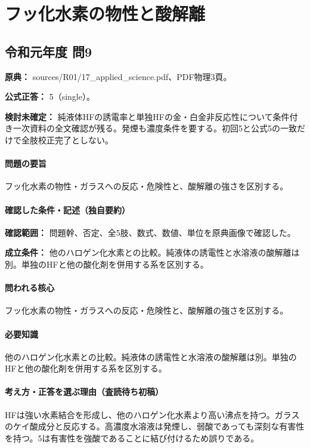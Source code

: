 \section{フッ化水素の物性と酸解離}

\subsection{令和元年度 問9}
\label{q:r01-reg-applied-09}

\noindent\textbf{原典：} sources/R01/17\_applied\_science.pdf、PDF物理3頁。

\textbf{公式正答：} 5（single）。

\par\textbf{検討未確定：} 純液体HFの誘電率と単独HFの金・白金非反応性について条件付き一次資料の全文確認が残る。発煙も濃度条件を要する。初回5と公式5の一致だけで全肢校正完了としない。

\paragraph{問題の要旨} フッ化水素の物性・ガラスへの反応・危険性と、酸解離の強さを区別する。

\paragraph{確認した条件・記述（独自要約）}\mbox{}\par

\noindent\textbf{確認範囲：} 問題幹、否定、全5肢、数式、数値、単位を原典画像で確認した。\par

\noindent\textbf{成立条件：} 他のハロゲン化水素との比較。純液体の誘電性と水溶液の酸解離は別。単独のHFと他の酸化剤を併用する系を区別する。\par

\paragraph{問われる核心} フッ化水素の物性・ガラスへの反応・危険性と、酸解離の強さを区別する。

\paragraph{必要知識} 他のハロゲン化水素との比較。純液体の誘電性と水溶液の酸解離は別。単独のHFと他の酸化剤を併用する系を区別する。

\paragraph{考え方・正答を選ぶ理由（査読待ち初稿）} HFは強い水素結合を形成し、他のハロゲン化水素より高い沸点を持つ。ガラスのケイ酸成分と反応する。高濃度水溶液は発煙し、弱酸であっても深刻な有害性を持つ。5は有害性を強酸であることに結び付けるため誤りである。

